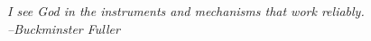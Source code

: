\chapter*{}
{\it I see God in the instruments and mechanisms that work reliably.\\ --Buckminster Fuller}